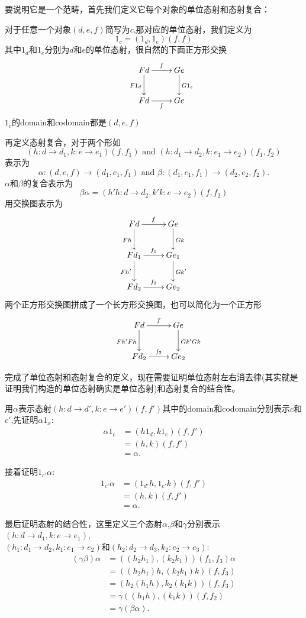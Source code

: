 \documentclass{article}
\newcommand{\al}{\alpha}
\newcommand{\be}{\beta}
\newcommand{\gm}{\gamma}
\newcommand{\AND}{\text{ and }}
\newcommand*{\xfunc}[4]{{#2}\colon{#3}{#1}{#4}}
\newcommand*{\func}[3]{\xfunc{\to}{#1}{#2}{#3}}
\newcommand*{\qty}[1]{\left({#1}\right)}
\begin{document}
要说明它是一个范畴，首先我们定义它每个对象的单位态射和态射复合：

对于任意一个对象$\qty{d,e,f}$简写为$c$,那对应的单位态射，我们定义为\[ 1_c  = \qty{1_{d},1_{e}}\qty{f,f}\]其中$1_d$和$1_e$分别为$d$和$e$的单位态射，很自然的下面正方形交换
\[\xymatrix{ &Fd \ar[d]_{F1_{d}} \ar[r]^{f} & Ge\ar[d]^{G1_{e}}
						 \\  & Fd\ar[r]_{f} &Ge   } \]
$1_c$的domain和codomain都是$\qty{d,e,f}$

再定义态射复合，对于两个形如
$$\qty{\func{h}{d}{d_1},\func{k}{e}{e_1}} \qty{f,f_1} \AND
	\qty{\func{h}{d_1}{d_2},\func{k}{e_1}{e_2}} \qty{f_1,f_2}$$ 
表示为
$$\func{\al}{(d,e,f)}{(d_1,e_1,f_1)} \AND
	\func{\be}{(d_1,e_1,f_1)}{(d_2,e_2,f_2)}.$$ $\al$和$\be$的复合表示为
\[\be  \al=\qty{\func{h'  h}{d}{d_{2}},\func{k'  k}{e}{e_{2}}}\qty{f,f_2}\]用交换图表示为\[\xymatrix{ Fd \ar[d]_{Fh} \ar[r]^{f} & Ge\ar[d]^{Gk}  \\
			Fd_{1} \ar[d]_{Fh'}\ar[r]^{f_{1}}& Ge_{1} \ar[d]^{Gk'} \\
	Fd_{2} \ar[r]^{f_{2}} &Ge_2 } \]两个正方形交换图拼成了一个长方形交换图，也可以简化为一个正方形\[\xymatrix{ &Fd \ar[d]_{Fh'  Fh}\ar[r]^{f} & Ge\ar[d]^{Gk' Gk}
			 \\  & Fd_2\ar[r]^{f_2} &Ge_2 }\]
			 
完成了单位态射和态射复合的定义，现在需要证明单位态射左右消去律(其实就是证明我们构造的单位态射确实是单位态射)和态射复合的结合性。

用$\al$表示态射$\qty{\func{h}{d}{d'},\func{k}{e}{e'}} \qty{f,f'}$其中的domain和codomain分别表示$c$和$c'$,先证明$\al 1_x$:
\begin{align*}
	\al  1_{c } &= \qty{h 1_{d},k 1_{e}}\qty{f,f'}\\
	&= \qty{h,k}\qty{f,f'} \\
	 &= \al.
\end{align*}

接着证明$1_{c'}\al$:
\begin{align*}
	1_{c' } \al &= \qty{1_{d'} h, 1_{e'} k}\qty{f,f'}\\
	&= \qty{h,k}\qty{f,f'}\\
	&= \al.
\end{align*}

最后证明态射的结合性，这里定义三个态射$\al$,$\be$和$\gm$分别表示$\qty{\func{h}{d}{d_1},\func{k}{e}{e_1}}$,\\$\qty{\func{h_1}{d_1}{d_2},\func{k_1}{e_1}{e_2}}$和$\qty{\func{h_2}{d_2}{d_3},\func{k_2}{e_2}{e_3}}$:
\begin{align*}
	(\gm\be)\al&=((h_2h_1),(k_2 k_1))(f_1,f_3) \al\\
	&=((h_2 h_1) h,(k_2 k_1) k)(f,f_3)\\
	&=(h_2(h_1 h),k_2(k_1 k))(f,f_3)\\
	&=\gm((h_1 h),(k_1 k))(f,f_2)\\
	&=\gm(\be \al).
\end{align*}
\end{document}
